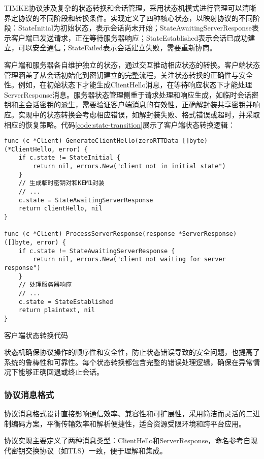TIMKE协议涉及复杂的状态转换和会话管理，采用状态机模式进行管理可以清晰界定协议的不同阶段和转换条件。实现定义了四种核心状态，以映射协议的不同阶段：StateInitial为初始状态，表示会话尚未开始；StateAwaitingServerResponse表示客户端已发送请求，正在等待服务器响应；StateEstablished表示会话已成功建立，可以安全通信；StateFailed表示会话建立失败，需要重新协商。

客户端和服务器各自维护独立的状态，通过交互推动相应状态的转换。客户端状态管理涵盖了从会话初始化到密钥建立的完整流程，关注状态转换的正确性与安全性。例如，在初始状态下才能生成ClientHello消息，在等待响应状态下才能处理ServerResponse消息。服务器状态管理侧重于请求处理和响应生成，如临时会话密钥和主会话密钥的派生，需要验证客户端消息的有效性，正确解封装共享密钥并响应。实现中的状态转换会考虑相应错误，如解封装失败、格式错误或超时，并采取相应的恢复策略。代码\ref{code:state-transition}展示了客户端状态转换逻辑：

\begin{listing}[ht]
\begin{verbatim}
func (c *Client) GenerateClientHello(zeroRTTData []byte) (*ClientHello, error) {
    if c.state != StateInitial {
        return nil, errors.New("client not in initial state")
    }
    // 生成临时密钥对和KEM1封装
    // ...
    c.state = StateAwaitingServerResponse
    return clientHello, nil
}

func (c *Client) ProcessServerResponse(response *ServerResponse) ([]byte, error) {
    if c.state != StateAwaitingServerResponse {
        return nil, errors.New("client not waiting for server response")
    }
    // 处理服务器响应
    // ...
    c.state = StateEstablished
    return plaintext, nil
}
\end{verbatim}
\caption{客户端状态转换代码}
\label{code:state-transition}
\end{listing}
状态机确保协议操作的顺序性和安全性，防止状态错误导致的安全问题，也提高了系统的鲁棒性和可靠性。每个状态转换都包含完整的错误处理逻辑，确保在异常情况下能够正确回退或终止会话。
\subsubsection{协议消息格式}
\label{subsubsec:message_format}
协议消息格式设计直接影响通信效率、兼容性和可扩展性，采用简洁而灵活的二进制编码方案，平衡传输效率和解析便捷性，适合资源受限环境和跨平台应用。

协议实现主要定义了两种消息类型：ClientHello和ServerResponse，命名参考自现代密钥交换协议（如TLS）一致，便于理解和集成。

